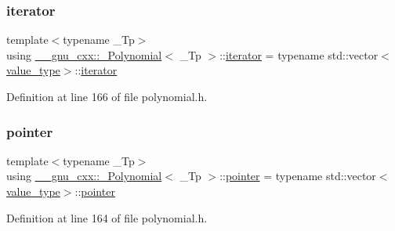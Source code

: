\subsubsection{\texorpdfstring{iterator}{iterator}}
{\footnotesize\ttfamily template$<$typename \+\_\+\+Tp$>$ \\
using \hyperlink{class____gnu__cxx_1_1__Polynomial}{\+\_\+\+\_\+gnu\+\_\+cxx\+::\+\_\+\+Polynomial}$<$ \+\_\+\+Tp $>$\+::\hyperlink{class____gnu__cxx_1_1__Polynomial_a64bd557b6af46992e352dbe9e30fa201}{iterator} =  typename std\+::vector$<$\hyperlink{class____gnu__cxx_1_1__Polynomial_a725563351f50e76084a7a016c06f8a53}{value\+\_\+type}$>$\+::\hyperlink{class____gnu__cxx_1_1__Polynomial_a64bd557b6af46992e352dbe9e30fa201}{iterator}}



Definition at line 166 of file polynomial.\+h.

\mbox{\label{class____gnu__cxx_1_1__Polynomial_a876dcb9c1b92c4896a3f3b9f26e7e3df}} 
\subsubsection{\texorpdfstring{pointer}{pointer}}
{\footnotesize\ttfamily template$<$typename \+\_\+\+Tp$>$ \\
using \hyperlink{class____gnu__cxx_1_1__Polynomial}{\+\_\+\+\_\+gnu\+\_\+cxx\+::\+\_\+\+Polynomial}$<$ \+\_\+\+Tp $>$\+::\hyperlink{class____gnu__cxx_1_1__Polynomial_a876dcb9c1b92c4896a3f3b9f26e7e3df}{pointer} =  typename std\+::vector$<$\hyperlink{class____gnu__cxx_1_1__Polynomial_a725563351f50e76084a7a016c06f8a53}{value\+\_\+type}$>$\+::\hyperlink{class____gnu__cxx_1_1__Polynomial_a876dcb9c1b92c4896a3f3b9f26e7e3df}{pointer}}



Definition at line 164 of file polynomial.\+h.

\mbox{\label{class____gnu__cxx_1_1__Polynomial_a656ceaafcb42abd626c253da3284998b}} 
